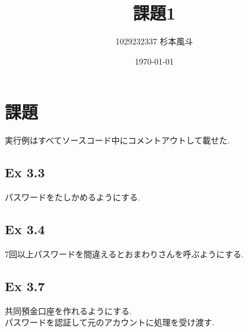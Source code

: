\documentclass[12pt]{article}
\title{課題1}
\author{1029232337 杉本風斗}
\date{\today}
\begin{document}
\lstset{numbers=left,basicstyle=\small\ttfamily}
\maketitle
\section{課題}
実行例はすべてソースコード中にコメントアウトして載せた.\\
\subsection{Ex 3.3}
パスワードをたしかめるようにする.\\

\subsection{Ex 3.4}
7回以上パスワードを間違えるとおまわりさんを呼ぶようにする.\\

\subsection{Ex 3.7}
共同預金口座を作れるようにする.\\
パスワードを認証して元のアカウントに処理を受け渡す.\\

\end{document}
